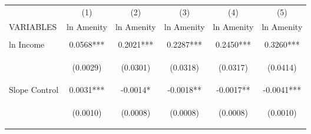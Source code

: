 
\begin{tabular}{lccccc} \hline
 & (1) & (2) & (3) & (4) & (5) \\
VARIABLES & ln Amenity & ln Amenity & ln Amenity & ln Amenity & ln Amenity \\ \hline
\vspace{4pt} & \begin{footnotesize}\end{footnotesize} & \begin{footnotesize}\end{footnotesize} & \begin{footnotesize}\end{footnotesize} & \begin{footnotesize}\end{footnotesize} & \begin{footnotesize}\end{footnotesize} \\
ln Income & 0.0568*** & 0.2021*** & 0.2287*** & 0.2450*** & 0.3260*** \\
\vspace{4pt} & \begin{footnotesize}(0.0029)\end{footnotesize} & \begin{footnotesize}(0.0301)\end{footnotesize} & \begin{footnotesize}(0.0318)\end{footnotesize} & \begin{footnotesize}(0.0317)\end{footnotesize} & \begin{footnotesize}(0.0414)\end{footnotesize} \\
Slope Control & 0.0031*** & -0.0014* & -0.0018** & -0.0017** & -0.0041*** \\
\vspace{4pt} & \begin{footnotesize}(0.0010)\end{footnotesize} & \begin{footnotesize}(0.0008)\end{footnotesize} & \begin{footnotesize}(0.0008)\end{footnotesize} & \begin{footnotesize}(0.0008)\end{footnotesize} & \begin{footnotesize}(0.0010)\end{footnotesize} \\

\end{tabular}
